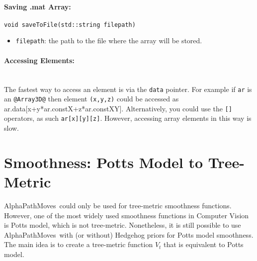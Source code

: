 \documentclass[12pt,letterpaper]{article}
\makeatletter
\def\APM{{\ttfamily AlphaPathMoves}~}
\def\keyhl[#1]{\lstinline{@#1@}}
\makeatother
\begin{document}
\paragraph{Saving .mat Array:}
\begin{lstlisting}
void saveToFile(std::string filepath)
\end{lstlisting}
\begin{itemize}
\item \lstinline{filepath}: the path to the file where the array will be stored.
\end{itemize}

\paragraph{Accessing Elements:}\hspace{-2ex}\\
The fastest way to access an element is via the \lstinline{data} pointer. For example if \lstinline{ar} is an \keyhl[Array3D] then element \lstinline{(x,y,z)} could be accessed as
{\ttfamily
ar.data[x+y*ar.constX+z*ar.constXY].
}
Alternatively, you could use the \lstinline{[]} operators, as such \lstinline{ar[x][y][z]}. However, accessing array elements in this way is slow.

\section{Smoothness: Potts Model to Tree-Metric}
\APM could only be used for tree-metric smoothness functions. However, one of the most widely used smoothness functions in Computer Vision is Potts model, which is not tree-metric.
Nonetheless, it is still possible to use \APM with (or without) Hedgehog priors for Potts model smoothness. The main idea is to create a tree-metric function $V_t$ that is equivalent to Potts model.
\end{document}

